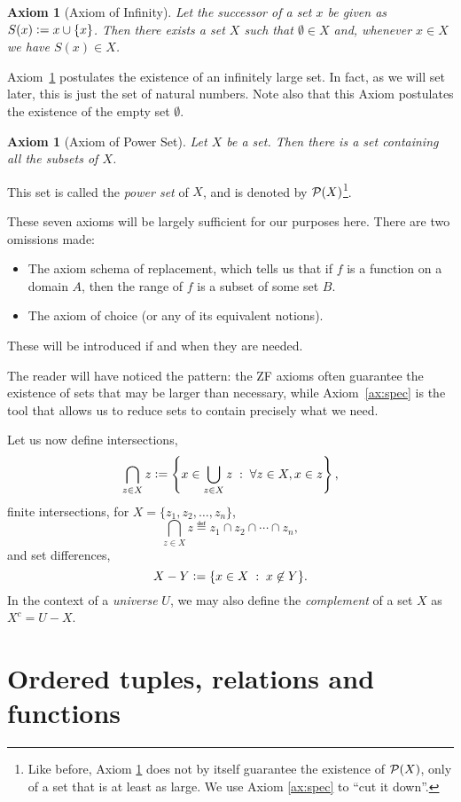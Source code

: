 \documentclass[a4paper, twoside, notitlepage, 11pt]{article}
\theoremstyle{plain}
\newtheorem{ax}[prop]{Axiom}
\theoremstyle{definition}
\theoremstyle{remark}
\numberwithin{equation}{section}
\begin{document}
\begin{ax}[Axiom of Infinity] \label{ax:inf}
Let the {\em successor} of a set $x$ be given as $S(x) \vcentcolon= x \cup \{x\}$. Then there exists a set $X$
such that $\emptyset \in X$ and, whenever $x \in X$ we have $S(x) \in X$.
\end{ax}

Axiom~\ref{ax:inf} postulates the existence of an infinitely large set. In fact, as we will set later, this is
just the set of natural numbers. Note also that this Axiom postulates the existence of the empty set
$\emptyset$.

\begin{ax}[Axiom of Power Set] \label{ax:pow}
Let $X$ be a set. Then there is a set containing all the subsets of $X$.
\end{ax}

This set is called the {\em power set} of $X$, and is denoted by $\mathcal{P}(X)$\footnote{Like before, Axiom
\ref{ax:pow} does not by itself guarantee the existence of $\mathcal{P}(X)$, only of a set that is at least as large.
We use Axiom \ref{ax:spec} to ``cut it down''.}.

These seven axioms will be largely sufficient for our purposes here. There are two omissions made:
\begin{itemize}
    \item The axiom schema of replacement, which tells us that if $f$ is a function on a domain $A$, then the
    range of $f$ is a subset of some set $B$.
    \item The axiom of choice (or any of its equivalent notions).
\end{itemize}
These will be introduced if and when they are needed.

The reader will have noticed the pattern: the ZF axioms often guarantee the existence of sets that may be
larger than necessary, while Axiom~\ref{ax:spec} is the tool that allows us to reduce sets to contain
precisely what we need.

Let us now define intersections,
\[
    \bigcap_{z \in X} z \vcentcolon= \left\{ x \in \bigcup_{z \in X} z \;:\; \forall z \in X, x \in z \right\},
\]
finite intersections, for $X = \{z_1, z_2, \ldots, z_n\}$,
\[
    \bigcap_{z \in X} z \eqdef z_1 \cap z_2 \cap \cdots \cap z_n,
\]
and set differences,
\[
    X - Y \vcentcolon= \{ x \in X \;:\; x \not\in Y \}.
\]
In the context of a {\em universe} $U$, we may also define the {\em complement} of a set $X$ as $X^c = U - X$.

\section{Ordered tuples, relations and functions}
\end{document}
